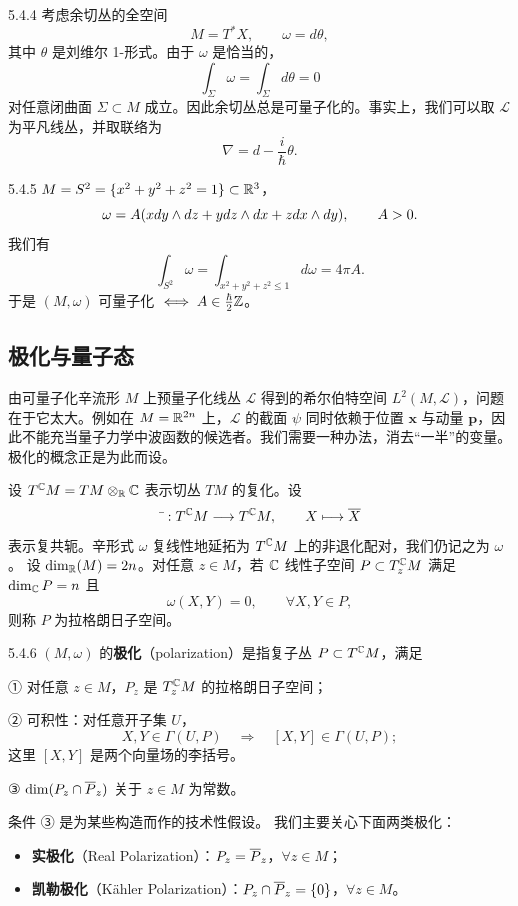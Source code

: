 \begin{example}{5.4.4}
  考虑余切丛的全空间
  \[
  M=T^*X,\qquad \omega=d\theta,
  \]
  其中 $\theta$ 是刘维尔 1-形式。由于 $\omega$ 是恰当的，
  \[
  \int_\Sigma\omega=\int_\Sigma d\theta=0
  \]
  对任意闭曲面 $\Sigma\subset M$ 成立。因此余切丛总是可量子化的。事实上，我们可以取 $\mathcal{L}$ 为平凡线丛，并取联络为
  \[
  \nabla=d-\frac{i}{\hbar}\theta.
  \]
\end{example}

\begin{example}{5.4.5}
  $M=S^2=\{x^2+y^2+z^2=1\}\subset\mathbb{R}^3$，
  \[
  \omega=A(xd y\wedge d z+yd z\wedge d x+zd x\wedge d y),
  \qquad A>0.
  \]
  我们有
  \[
  \int_{S^2}\omega=\int_{x^2+y^2+z^2\le1}d\omega=4\pi A.
  \]
  于是 $(M,\omega)$ 可量子化 $\iff A\in\frac{\hbar}{2}\mathbb{Z}$。
\end{example}

\subsection{极化与量子态}

由可量子化辛流形 $M$ 上预量子化线丛 $\mathcal{L}$ 得到的希尔伯特空间
$L^2(M,\mathcal{L})$，问题在于它太大。例如在 $M=\mathbb{R}^{2n}$ 上，$\mathcal{L}$ 的截面 $\psi$ 同时依赖于位置 $\mathbf x$ 与动量 $\mathbf p$，因此不能充当量子力学中波函数的候选者。我们需要一种办法，消去“一半”的变量。极化的概念正是为此而设。

设 $T^{\mathbb{C}} M=TM\otimes_{\mathbb{R}}\mathbb{C}$ 表示切丛 $TM$ 的复化。设
\[
\bar{\ }:T^{\mathbb{C}} M\longrightarrow T^{\mathbb{C}} M,\qquad X\longmapsto\overline{X}
\]
表示复共轭。辛形式 $\omega$ 复线性地延拓为 $T^{\mathbb{C}} M$ 上的非退化配对，我们仍记之为 $\omega$。
设 $\dim_{\mathbb{R}}(M)=2n$。对任意 $z\in M$，若 $\mathbb{C}$ 线性子空间 $P\subset T_z^{\mathbb{C}} M$ 满足 $\dim_{\mathbb{C}}P=n$ 且
\[
\omega(X,Y)=0,\qquad\forall X,Y\in P,
\]
则称 $P$ 为拉格朗日子空间。

\begin{definition}{5.4.6}
  $(M,\omega)$ 的\textbf{极化}（polarization）是指复子丛 $P\subset T^{\mathbb{C}} M$，满足
  
  ① 对任意 $z\in M$，$P_z$ 是 $T_z^{\mathbb{C}} M$ 的拉格朗日子空间；
  
  ② 可积性：对任意开子集 $U$，
  \[
  X,Y\in\Gamma(U,P)\quad\Longrightarrow\quad[X,Y]\in\Gamma(U,P);
  \]
  这里 $[X,Y]$ 是两个向量场的李括号。
  
  ③ $\dim(P_z\cap\overline{P}_z)$ 关于 $z\in M$ 为常数。
\end{definition}

条件 ③ 是为某些构造而作的技术性假设。
我们主要关心下面两类极化：
\begin{itemize}
  \item[a)] \textbf{实极化}（Real Polarization）：$P_z=\overline{P}_z$，$\forall z\in M$；
  \item[b)] \textbf{凯勒极化}（Kähler Polarization）：$P_z\cap\overline{P}_z=\{0\}$，$\forall z\in M$。
\end{itemize}


